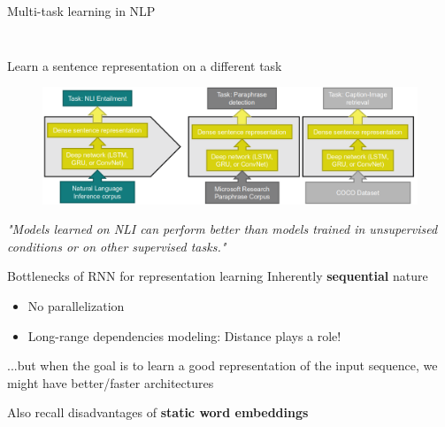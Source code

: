 \documentclass[12pt,aspectratio=169,handout]{beamer}
\begin{document}
\begin{frame}{Multi-task learning in NLP}
\begin{columns}
\begin{column}{0.48\textwidth}
\begin{figure}
\end{figure}
\end{column}
\end{columns}


	
\end{frame}


\begin{frame}{Learn a sentence representation on a different task}
	
	\begin{figure}
		\includegraphics[width=\linewidth]{img/transfer.png}
	\end{figure}
	
	\begin{small}
		\emph{"Models learned on NLI can perform better than models trained in unsupervised conditions or on other supervised tasks."}
	\end{small}
	

\end{frame}


\begin{frame}{Bottlenecks of RNN for representation learning}
	Inherently \textbf{sequential} nature
	
	\begin{itemize}
		\item No parallelization
		\item Long-range dependencies modeling: Distance plays a role!
	\end{itemize}
	
	...but when the goal is to learn a good representation of the input sequence, we might have better/faster architectures

\bigskip

Also recall disadvantages of \textbf{static word embeddings}
	
\end{frame}
\end{document}

